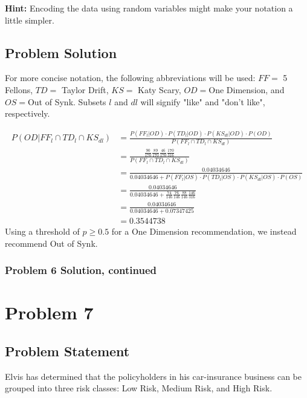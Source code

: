 \documentclass[12pt]{article}
\theoremstyle{definition}
\begin{document}
\bigskip
\noindent
{\bf Hint:} Encoding the data using random variables might make your notation a little simpler.

\newpage
\subsection*{Problem Solution}
For more concise notation, the following abbreviations will be used: $FF = $ 5 Fellons, $TD = $ Taylor Drift, $KS = $ Katy Scary, $OD = $One Dimension, and $OS = $Out of Synk. Subsets $l$ and $dl$ will signify "like" and "don't like", respectively.


\begin{align*}
P(OD|FF_l \cap TD_l \cap KS_{dl}) &= \frac{P(FF_l|OD) \cdot P(TD_l|OD) \cdot P(KS_{dl}|OD) \cdot P(OD)}{P(FF_l \cap TD_l \cap KS_{dl})}\\
&= \frac{\frac{90}{170}\frac{89}{170}\frac{46}{170}\frac{170}{316}}{P(FF_l \cap TD_l \cap KS_{dl})}\\
&= \frac{0.04034646}{0.04034646 + P(FF_l|OS) \cdot P(TD_l|OS) \cdot P(KS_{dl}|OS) \cdot P(OS)}\\
&= \frac{0.04034646}{0.04034646 + \frac{74}{146}\frac{76}{146}\frac{88}{146}\frac{146}{316}}\\
&= \frac{0.04034646}{0.04034646 + 0.07347425}\\
&= 0.3544738
\end{align*}
Using a threshold of $p \geq 0.5$ for a One Dimension recommendation, we instead recommend Out of Synk.

\newpage
\subsubsection*{Problem 6 Solution, continued}



\newpage
\section*{Problem 7}


\subsection*{Problem Statement}

Elvis has determined that the policyholders in his car-insurance business can be grouped into three risk classes: Low Risk, Medium Risk, and High Risk.
\end{document}
